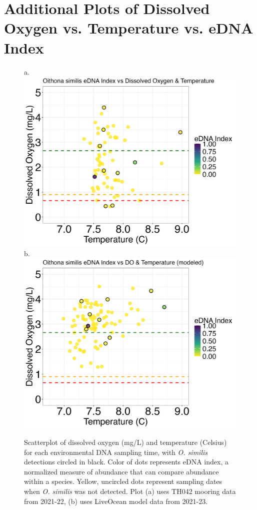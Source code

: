 \documentclass[12pt,twoside]{reedthesis}
\begin{document}
	\chapter{Additional Plots of Dissolved Oxygen vs. Temperature vs. eDNA Index}\label{chap:appPlots}
	
	\begin{figure}[!h]
		\begin{center}
			a. \includegraphics[scale=0.3]{Osimilis_Scatter_noOut}
			b. \includegraphics[scale=0.3]{Osimilis_Scatter_AllYr_mod_noOut}
			\caption[\textit{O. similis} scatterplot]{\footnotesize{Scatterplot of dissolved oxygen (mg/L) and temperature (Celsius) for each environmental DNA sampling time, with \textit{O. similis} detections circled in black. Color of dots represents eDNA index, a normalized measure of abundance that can compare abundance within a species. Yellow, uncircled dots represent sampling dates when \textit{O. similis} was not detected. Plot (a) uses TH042 mooring data from 2021-22, (b) uses LiveOcean model data from 2021-23.}} %
			\label{OsimilisScatter}
		\end{center}
	\end{figure} 
	
\end{document}
